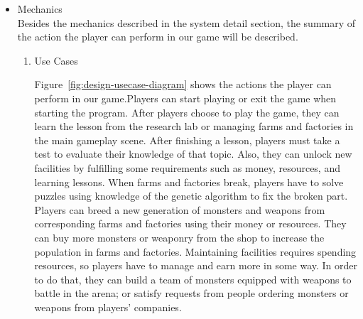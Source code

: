 \documentclass[12pt,oneside,openright,a4paper]{cpe-english-project}
\begin{document}
\begin{itemize}
\item Mechanics \\
Besides the mechanics described in the system detail section, the summary of the action the player can perform in our game will be described.

\begin{enumerate}
	\item Use Cases \\
	\begin{minipage}[c]{\textwidth}\centering
	\label{fig:design-usecase-diagram}
	\end{minipage}
	Figure~\ref{fig:design-usecase-diagram} shows the actions the player can perform in our game.Players can start playing or exit the game when starting the program. After players choose to play the game, they can learn the lesson from the research lab or managing farms and factories in the main gameplay scene. After finishing a lesson, players must take a test to evaluate their knowledge of that topic. Also, they can unlock new facilities by fulfilling some requirements such as money, resources, and learning lessons. When farms and factories break, players have to solve puzzles using knowledge of the genetic algorithm to fix the broken part. Players can breed a new generation of monsters and weapons from corresponding farms and factories using their money or resources. They can buy more monsters or weaponry from the shop to increase the population in farms and factories. Maintaining facilities requires spending resources, so players have to manage and earn more in some way. In order to do that, they can build a team of monsters equipped with weapons to battle in the arena; or satisfy requests from people ordering monsters or weapons from players' companies.


\end{enumerate}
\end{itemize}
\end{document}
